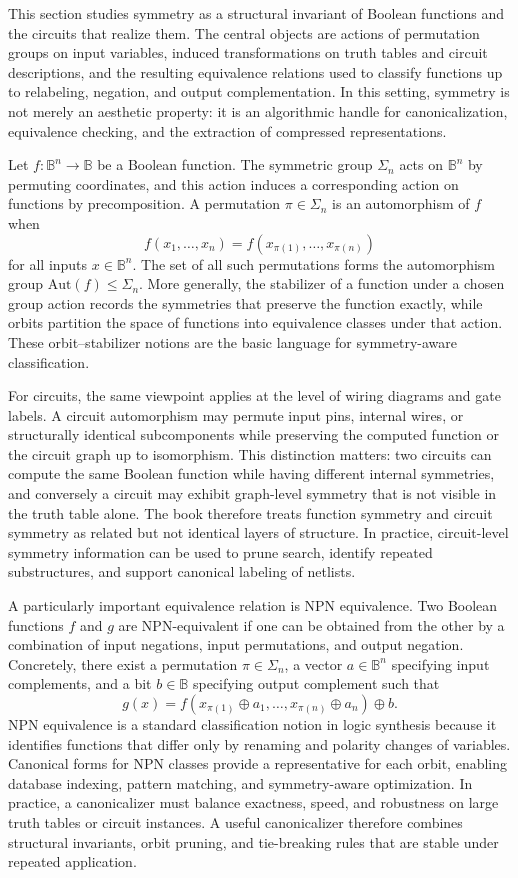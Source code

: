 This section studies symmetry as a structural invariant of Boolean functions and the circuits that realize them. The central objects are actions of permutation groups on input variables, induced transformations on truth tables and circuit descriptions, and the resulting equivalence relations used to classify functions up to relabeling, negation, and output complementation. In this setting, symmetry is not merely an aesthetic property: it is an algorithmic handle for canonicalization, equivalence checking, and the extraction of compressed representations.

Let $f : \mathbb{B}^n \to \mathbb{B}$ be a Boolean function. The symmetric group $\Sigma_n$ acts on $\mathbb{B}^n$ by permuting coordinates, and this action induces a corresponding action on functions by precomposition. A permutation $\pi \in \Sigma_n$ is an automorphism of $f$ when
\[
  f(x_1,\dots,x_n) = f(x_{\pi(1)},\dots,x_{\pi(n)})
\]
for all inputs $x \in \mathbb{B}^n$. The set of all such permutations forms the automorphism group $\mathrm{Aut}(f) \leq \Sigma_n$. More generally, the stabilizer of a function under a chosen group action records the symmetries that preserve the function exactly, while orbits partition the space of functions into equivalence classes under that action. These orbit--stabilizer notions are the basic language for symmetry-aware classification.

For circuits, the same viewpoint applies at the level of wiring diagrams and gate labels. A circuit automorphism may permute input pins, internal wires, or structurally identical subcomponents while preserving the computed function or the circuit graph up to isomorphism. This distinction matters: two circuits can compute the same Boolean function while having different internal symmetries, and conversely a circuit may exhibit graph-level symmetry that is not visible in the truth table alone. The book therefore treats function symmetry and circuit symmetry as related but not identical layers of structure. In practice, circuit-level symmetry information can be used to prune search, identify repeated substructures, and support canonical labeling of netlists.

A particularly important equivalence relation is NPN equivalence. Two Boolean functions $f$ and $g$ are NPN-equivalent if one can be obtained from the other by a combination of input negations, input permutations, and output negation. Concretely, there exist a permutation $\pi \in \Sigma_n$, a vector $a \in \mathbb{B}^n$ specifying input complements, and a bit $b \in \mathbb{B}$ specifying output complement such that
\[
  g(x) = f(x_{\pi(1)} \oplus a_1,\dots,x_{\pi(n)} \oplus a_n) \oplus b.
\]
NPN equivalence is a standard classification notion in logic synthesis because it identifies functions that differ only by renaming and polarity changes of variables. Canonical forms for NPN classes provide a representative for each orbit, enabling database indexing, pattern matching, and symmetry-aware optimization. In practice, a canonicalizer must balance exactness, speed, and robustness on large truth tables or circuit instances. A useful canonicalizer therefore combines structural invariants, orbit pruning, and tie-breaking rules that are stable under repeated application.

